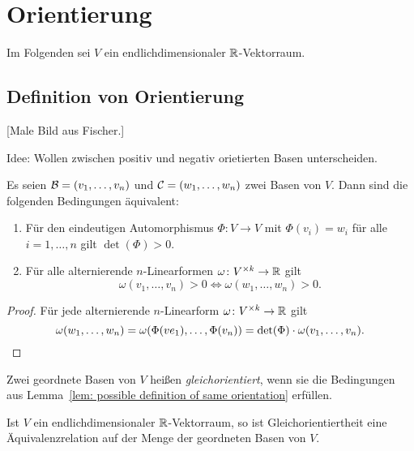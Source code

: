\section{Orientierung}


Im Folgenden sei $V$ ein endlichdimensionaler $\mathbb{R}$-Vektorraum.










\subsection{Definition von Orientierung}


[Male Bild aus Fischer.]


Idee: Wollen zwischen positiv und negativ orietierten Basen unterscheiden.


\begin{lemma}\label{lem: possible definition of same orientation}
  Es seien $\mathcal{B} = (v_1, \dotsc, v_n)$ und $\mathcal{C} = (w_1, \dotsc, w_n)$ zwei Basen von $V$.
  Dann sind die folgenden Bedingungen äquivalent:
  \begin{enumerate}[leftmargin=*, label=\roman*)]
    \item
      Für den eindeutigen Automorphismus $\Phi \colon V \to V$ mit $\Phi(v_i) = w_i$ für alle $i = 1, \dotsc, n$ gilt $\det(\Phi) > 0$.
    \item
      Für alle alternierende $n$-Linearformen $\omega \colon V^{\times k} \to \mathbb{R}$ gilt
      \[
        \omega(v_1, \dotsc, v_n) > 0
        \iff
        \omega(w_1, \dotsc, w_n) > 0.
      \]
  \end{enumerate}
\end{lemma}


\begin{proof}
  Für jede alternierende $n$-Linearform $\omega \colon V^{\times k} \to \mathbb{R}$ gilt
  \[
      \omega(w_1, \dotsc, w_n)
    = \omega(\Phi(ve_1), \dotsc, \Phi(v_n))
    = \det(\Phi) \cdot \omega(v_1, \dotsc, v_n).
    \qedhere
  \]
\end{proof}



\begin{definition}
  Zwei geordnete Basen von $V$ heißen \emph{gleichorientiert}, wenn sie die Bedingungen aus Lemma~\ref{lem: possible definition of same orientation} erfüllen.
\end{definition}


\begin{lemma}
  Ist $V$ ein endlichdimensionaler $\mathbb{R}$-Vektorraum, so ist Gleichorientiertheit eine Äquivalenzrelation auf der Menge der geordneten Basen von $V$.
\end{lemma}


